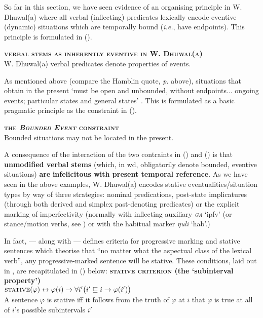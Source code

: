 

So far in this section, we have seen evidence of an organising principle in W. Dhuwal(a) where all verbal (inflecting) predicates lexically encode eventive (dynamic) situations which are temporally bound (\textit{i.e.}, have endpoints). This principle is formulated in (\nextx).



\ex \textbf{\textsc{verbal stems as inherently eventive in W. Dhuwal(a)}}\\
W. Dhuwal(a) verbal predicates denote properties of events.
\xe


\noindent As mentioned above (compare the Hamblin quote, \textit{p.} \pageref{sec:djr-prs} above), situations that obtain in the present `must be open and unbounded, without endpoints... ongoing events; particular states and general states' \citet[230]{Smith2008}. This is formulated as a basic pragmatic principle as the constraint in (\nextx).

\ex  \textsc{\textbf{the \textit{Bounded Event} constraint}}\\
Bounded situations may not be located in the present.\hfill\citep[231]{Smith2008}
\xe


\noindent A consequence of the interaction of the two contraints in () and () is that\textbf{ unmodified verbal stems} (which, in \gls{wd}, obligatorily denote bounded, eventive situations) \textbf{are} \textbf{infelicitous with present temporal reference}. As we have seen in the above examples, W. Dhuwal(a) encodes stative eventualities/situation types by way of three strategies:
\pex[nopreamble]\a nominal predications,
\a post-state implicatures (through both derived and simplex past-denoting predicates) or 
\a the explicit marking of imperfectivity (normally with inflecting auxiliary \textit{\textsc{ga}} `\gls{ipfv}' (or stance/motion verbs, see \citealp[369]{Wilkinson1991}) or with the habitual marker \textit{ŋuli} `\gls{hab}'.)\xe

In fact, \citet{Dowty1979,Dowty1986} --- along with \citet{Taylor1977} --- defines criteria for progressive marking and stative sentences which theorise that ``no matter what the aspectual class of the lexical verb'', any progressive-marked sentence will be stative. These conditions, laid out in \citet[42-4]{Dowty1986}, are recapitulated in () below:
\pex\a {}\textbf{\textsc{stative criterion} (the `subinterval property')}\\
$ \textsc{stative}(\varphi) \leftrightarrow \varphi(i)\to\forall i'\big(i'\sqsubseteq i\to\varphi(i')\big)$\\
A sentence $ \varphi $ is stative iff it follows from the truth of $ \varphi $ at $ i $ that $ \varphi $ is true at all of $ i $'s possible subintervals $ i' $

